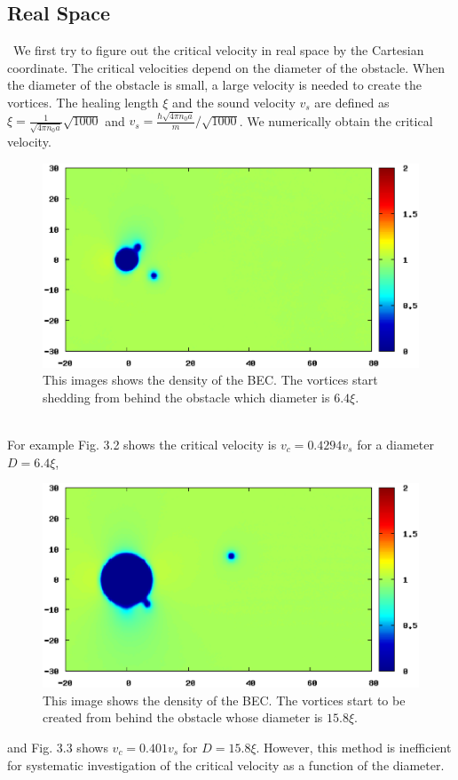 \documentclass[12pt,a4paper]{report} %
\begin{document}
\subsection{Real Space}
\ We first try to figure out the critical velocity in real space by the Cartesian coordinate.
The critical velocities depend on the diameter of the obstacle.
When the diameter of the obstacle is small, a large velocity is needed to create the vortices.
The healing length $\xi$ and the sound velocity $v_s$ are defined as
$\xi = \frac{1}{\sqrt{4 \pi n_0 a}}\sqrt{1000}$ and $v_s = \frac{\hbar \sqrt{4 \pi n_0 a}}{m}/\sqrt{1000}$.
We numerically obtain the critical velocity.
\begin{figure}[htbp]\begin{center}
\includegraphics[scale=0.4,keepaspectratio]{3-2.eps}
\caption{
This images shows the density of the BEC.
The vortices start shedding from behind the obstacle which diameter is $6.4\xi$.
}
\label{FIG:3-2}
\end{center}\end{figure}
\\ For example Fig. 3.2 shows the critical velocity is $v_c = 0.4294v_s$ for a diameter $D = 6.4\xi$,
\begin{figure}[htbp]\begin{center}
\includegraphics[scale=0.4,keepaspectratio]{3-3.eps}
\caption{
This image shows the density of the BEC.
The vortices start to be created from behind the obstacle whose diameter is $15.8 \xi$.
}
\label{FIG:3-3}
\end{center}\end{figure}
and Fig. 3.3 shows $v_c = 0.401v_s$ for $D = 15.8\xi$.
However, this method is inefficient for systematic investigation of the critical velocity
as a function of the diameter.
\end{document}
